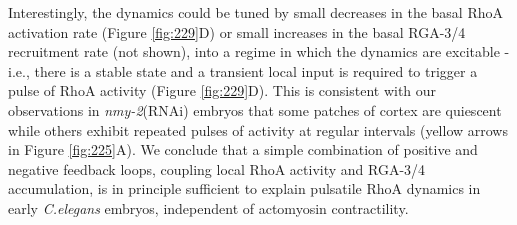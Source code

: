 Interestingly, the dynamics could be tuned by small decreases in the basal RhoA activation rate (Figure \ref{fig:229}D) or small increases in the basal RGA-3/4 recruitment rate (not shown), into a regime in which the dynamics are excitable - i.e., there is a stable state and a transient local input is required to trigger a pulse of RhoA activity (Figure \ref{fig:229}D).  This is consistent with our observations in \textit{nmy-2}(RNAi) embryos that some patches of cortex are quiescent while others exhibit repeated pulses of activity at regular intervals (yellow arrows in Figure \ref{fig:225}A). We conclude that a simple combination of positive and negative feedback loops, coupling local RhoA activity and RGA-3/4 accumulation, is in principle sufficient to explain pulsatile RhoA dynamics in early \textit{C.elegans} embryos, independent of actomyosin contractility.





